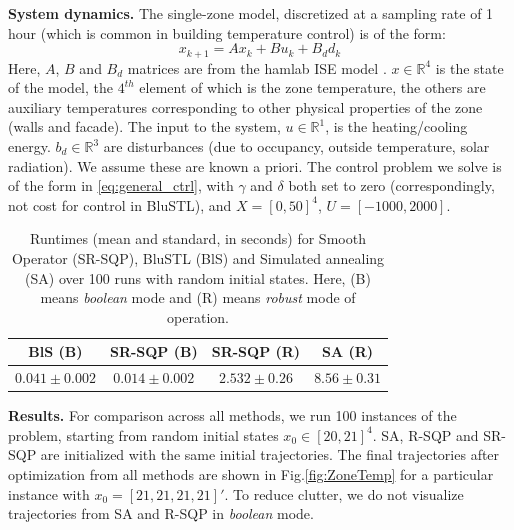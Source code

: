 \textbf{System dynamics.} The single-zone model, discretized at a sampling rate of 1 hour (which is common in building temperature control) is of the form:
\begin{equation}
\label{eq:bldg_dyn}
x_{k+1} = Ax_{k}+Bu_k+B_dd_k
\end{equation}
Here, $A$, $B$ and $B_d$ matrices are from the hamlab ISE model \cite{VanSchijndel2005}. $x \in \mathbb{R}^4$ is the state of the model, the $4^{th}$ element of which is the zone temperature, the others are auxiliary temperatures corresponding to other physical properties of the zone (walls and facade). The input to the system, $u \in \mathbb{R}^1$, is the heating/cooling energy. $b_d \in \mathbb{R}^3$ are disturbances (due to occupancy, outside temperature, solar radiation). We assume these are known a priori.
The control problem we solve is of the form in \eqref{eq:general_ctrl}, with $\gamma$ and $\delta$ both set to zero (correspondingly, not cost for control in BluSTL), and $X=[0,50]^4$, $U=[-1000,2000]$.

\begin{table}[tb]
\small
\begin{center}
\caption{{\small Runtimes (mean and standard, in seconds) for Smooth Operator (SR-SQP), BluSTL (BlS) and Simulated annealing (SA) over 100 runs with random initial states. Here, (B) means \textit{boolean} mode and (R) means \textit{robust} mode of operation.}}
\vspace{-5pt}
\label{tbl:time_performance_bldg}
\begin{tabular} {|c|c|c|c|}
	\hline
	BlS (B) & SR-SQP (B) & SR-SQP (R) & SA (R) \\ \hline
	 $0.041 \pm 0.002$ &  $\mathbf{0.014 \pm 0.002}$  &  $2.532 \pm 0.26$ & $8.56 \pm 0.31$ \\ \hline 
\end{tabular}	
\end{center}
\end{table}



\textbf{Results.} For comparison across all methods, we run 100 instances of the problem, starting from random initial states $x_0 \in [20,21]^4$. SA, R-SQP and SR-SQP are initialized with the same initial trajectories. The final trajectories after optimization from all methods are shown in Fig.\ref{fig:ZoneTemp} for a particular instance with $x_0 = [21,21,21,21]'$. To reduce clutter, we do not visualize trajectories from SA and R-SQP in \textit{boolean} mode. 

